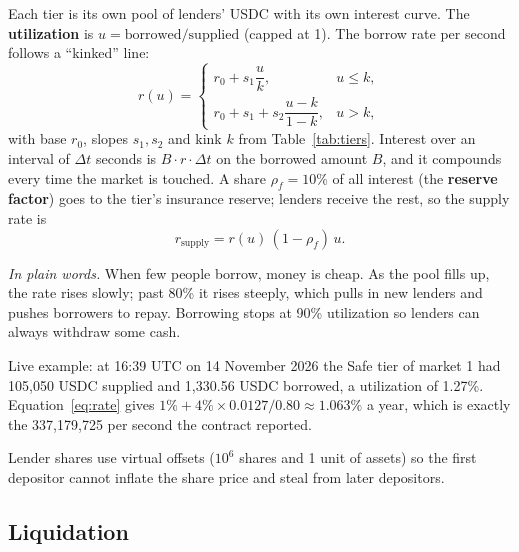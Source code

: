 \documentclass[11pt,a4paper]{article}
\newcommand{\inwords}[1]{\par\noindent\colorbox{note}{\parbox{\dimexpr\linewidth-2\fboxsep}{\small\textit{In plain words.} #1}}\par}
\begin{document}
Each tier is its own pool of lenders' USDC with its own interest curve. The \textbf{utilization} is
$u = \text{borrowed} / \text{supplied}$ (capped at 1). The borrow rate per second follows a ``kinked'' line:
\begin{equation}
  r(u) =
  \begin{cases}
    r_0 + s_1 \dfrac{u}{k}, & u \le k,\\[2mm]
    r_0 + s_1 + s_2 \dfrac{u - k}{1 - k}, & u > k,
  \end{cases}
  \label{eq:rate}
\end{equation}
with base $r_0$, slopes $s_1, s_2$ and kink $k$ from Table~\ref{tab:tiers}. Interest over an interval of $\Delta t$
seconds is $B \cdot r \cdot \Delta t$ on the borrowed amount $B$, and it compounds every time the market is touched.
A share $\rho_f = 10\%$ of all interest (the \textbf{reserve factor}) goes to the tier's insurance reserve; lenders
receive the rest, so the supply rate is
\begin{equation}
  r_{\text{supply}} = r(u)\,(1-\rho_f)\,u .
  \label{eq:supply}
\end{equation}
\inwords{When few people borrow, money is cheap. As the pool fills up, the rate rises slowly; past 80\% it rises
steeply, which pulls in new lenders and pushes borrowers to repay. Borrowing stops at 90\% utilization so lenders can
always withdraw some cash.}
Live example: at 16:39 UTC on 14 November 2026 the Safe tier of market 1 had 105,050 USDC supplied and 1,330.56 USDC borrowed, a
utilization of 1.27\%. Equation~\eqref{eq:rate} gives $1\% + 4\% \times 0.0127/0.80 \approx 1.063\%$ a year, which is
exactly the 337,179,725 per second the contract reported.

Lender shares use virtual offsets ($10^6$ shares and 1 unit of assets) so the first depositor cannot inflate the
share price and steal from later depositors.

\subsection{Liquidation}
\end{document}
